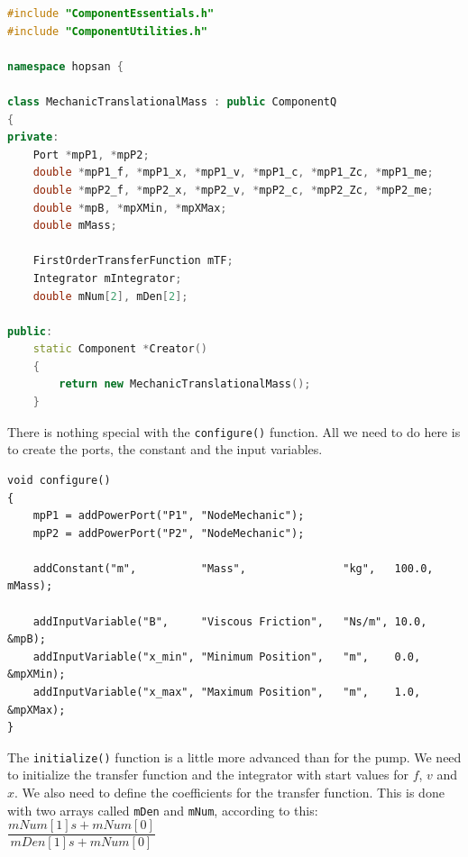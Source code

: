 \documentclass[a4paper,pdftex]{article}
\begin{document}
\noindent 
\begin{minipage}{\linewidth}
\begin{lstlisting}[language=c++, basicstyle=\footnotesize\ttfamily]
#include "ComponentEssentials.h"
#include "ComponentUtilities.h"

namespace hopsan {

class MechanicTranslationalMass : public ComponentQ
{
private:
    Port *mpP1, *mpP2;
    double *mpP1_f, *mpP1_x, *mpP1_v, *mpP1_c, *mpP1_Zc, *mpP1_me;
    double *mpP2_f, *mpP2_x, *mpP2_v, *mpP2_c, *mpP2_Zc, *mpP2_me;
    double *mpB, *mpXMin, *mpXMax;
    double mMass;

    FirstOrderTransferFunction mTF;
    Integrator mIntegrator;
    double mNum[2], mDen[2];

public:
    static Component *Creator()
    {
        return new MechanicTranslationalMass();
    }
\end{lstlisting}
\end{minipage}
 	
\noindent There is nothing special with the \texttt{configure()} function. All we need to do here is to create the ports, the constant and the input variables.

\noindent 
\begin{minipage}{\linewidth}
\begin{lstlisting}[basicstyle=\footnotesize\ttfamily]
void configure()
{
    mpP1 = addPowerPort("P1", "NodeMechanic");
    mpP2 = addPowerPort("P2", "NodeMechanic");

    addConstant("m",          "Mass",               "kg",   100.0, mMass);
    
    addInputVariable("B",     "Viscous Friction",   "Ns/m", 10.0,  &mpB);
    addInputVariable("x_min", "Minimum Position",   "m",    0.0,   &mpXMin);
    addInputVariable("x_max", "Maximum Position",   "m",    1.0,   &mpXMax);
}
\end{lstlisting}
\end{minipage}
 
\noindent The \texttt{initialize()} function is a little more advanced than for the pump. We need to initialize the transfer function and the integrator with start values for $f$, $v$ and $x$. We also need to define the coefficients for the transfer function. This is done with two arrays called \texttt{mDen} and \texttt{mNum}, according to this:\\

$\dfrac{mNum[1] s + mNum[0]}{mDen[1] s + mNum[0]}$\\
 
\end{document}
